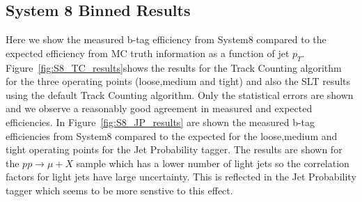 \subsection{System 8 Binned Results}

Here we show the measured b-tag efficiency from System8 compared to the 
expected efficiency from MC truth information as a function of jet $p_{T} $.
Figure~\ref{fig:S8_TC_results}shows the results for the Track Counting
algorithm for the three operating points (loose,medium and tight) and also the 
SLT results using the default Track 
Counting algorithm. Only the statistical errors are shown and we observe a 
reasonably good agreement in measured and expected efficiencies. In 
Figure~\ref{fig:S8_JP_results} are shown the measured
b-tag efficiencies from System8 compared to the expected for the loose,medium 
and tight operating points for the Jet Probability tagger. The results are 
shown for the $pp\rightarrow \mu + X$ sample which has a lower number of light 
jets so the correlation factors for light jets have large uncertainty. This is 
reflected in the Jet Probability tagger which seems to be more senstive to this
effect.

